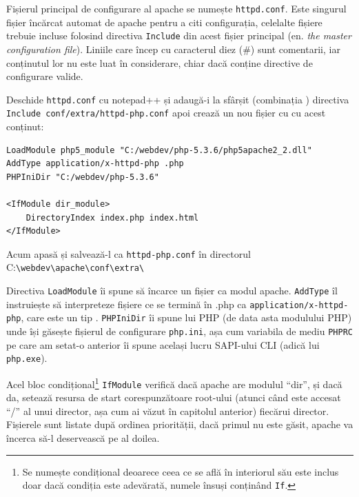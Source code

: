 Fișierul principal de configurare  al apache se numește \texttt{httpd.conf}. Este singurul
fișier încărcat automat de apache pentru a citi configurația, celelalte fișiere
trebuie incluse folosind directiva \texttt{Include} din acest fișier
principal (en. \textsl{the master configuration file}). Liniile care încep
cu caracterul diez (\#) sunt comentarii, iar conținutul lor nu este luat
în considerare, chiar dacă conține directive de configurare valide.

Deschide \texttt{httpd.conf} cu notepad++ și adaugă-i la sfârșit
(combinația ) directiva
\texttt{Include conf/extra/httpd-php.conf}
apoi crează un nou fișier cu  cu acest conținut:
\begin{verbatim}
LoadModule php5_module "C:/webdev/php-5.3.6/php5apache2_2.dll"
AddType application/x-httpd-php .php
PHPIniDir "C:/webdev/php-5.3.6"

<IfModule dir_module>
    DirectoryIndex index.php index.html
</IfModule>
\end{verbatim}

Acum apasă  și salvează-l ca \texttt{httpd-php.conf}
în directorul
C:\texttt{{\textbackslash}webdev{\textbackslash}apache{\textbackslash}conf{\textbackslash}extra{\textbackslash}}

Directiva \texttt{LoadModule} îi spune să încarce un fișier ca modul apache. \texttt{AddType}
îl instruiește să interpreteze fișiere ce se termină în .php ca 
\texttt{application/x-httpd-php}, care este un tip 
.
\texttt{PHPIniDir} îi spune lui PHP (de data asta modulului PHP) unde își găsește fișierul
de configurare \texttt{php.ini}, așa cum variabila de mediu \texttt{PHPRC} pe care
am setat-o anterior îi spune același lucru SAPI-ului CLI (adică lui \texttt{php.exe}).

Acel bloc condițional\footnote{Se numește condițional deoarece ceea ce se află
în interiorul său este inclus doar dacă condiția este adevărată, numele însuși
conținând \texttt{If}.}
 \texttt{IfModule} verifică dacă apache are modulul ``dir'', și dacă
da, setează resursa de start corespunzătoare root-ului (atunci când este accesat ``/''
al unui director, așa cum ai văzut în capitolul anterior) fiecărui director. Fișierele
sunt listate după ordinea priorității, dacă primul nu este găsit, apache va încerca să-l
deservească pe al doilea.


